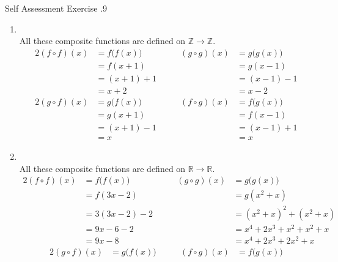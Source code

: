 \documentclass[\main/notes.tex]{subfiles}
\begin{document}
			\begin{exercise}{Self Assessment Exercise \thechapter.9}
				\begin{enumerate}[label=(\alph*)]
					\item {}\\
						All these composite functions are defined on $\mathbb{Z} \rightarrow \mathbb{Z}$.
						\begin{alignat*}{2}
							(f \circ f)(x) &= f\bigl(f(x)\bigr) \qquad & (g \circ g)(x) &= g\bigl(g(x)\bigr)\\
							&= f(x + 1) \qquad & &= g(x - 1)\\
							&= (x + 1) + 1 \qquad & &= (x - 1) - 1\\
							&= x + 2 \qquad & &= x - 2
						\end{alignat*}
						\begin{alignat*}{2}
							(g \circ f)(x) &= g\bigl(f(x)\bigr) \qquad & (f \circ g)(x) &= f\bigl(g(x)\bigr)\\
							&= g(x + 1) \qquad & &= f(x - 1)\\
							&= (x + 1) - 1 \qquad & &= (x - 1) + 1\\
							&= x \qquad & &= x
						\end{alignat*}
					\item {}\\
						All these composite functions are defined on $\mathbb{R} \rightarrow \mathbb{R}$.
						\begin{alignat*}{2}
							(f \circ f)(x) &= f\bigl(f(x)\bigr) \qquad & (g \circ g)(x) &= g\bigl(g(x)\bigr)\\
							&= f(3x - 2) \qquad & &= g\left(x^{2} + x\right)\\
							&= 3(3x - 2) - 2 \qquad & &= \left(x^{2} + x\right)^{2} + \left(x^{2} + x\right)\\
							&= 9x - 6 - 2 \qquad & &= x^{4} + 2x^{3} + x^{2} + x^{2} + x\\
							&= 9x - 8 \qquad & &= x^{4} + 2x^{3} + 2x^{2} + x
						\end{alignat*}
						\begin{alignat*}{2}
							(g \circ f)(x) &= g\bigl(f(x)\bigr) \qquad & (f \circ g)(x) &= f\bigl(g(x)\bigr)\\

\end{alignat*}
\end{enumerate}
\end{exercise}
\end{document}

